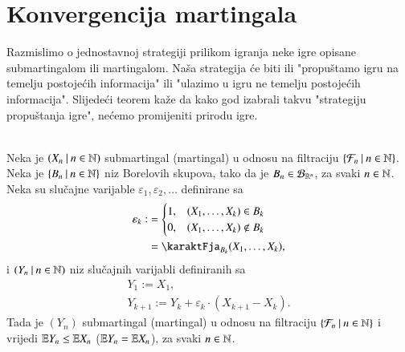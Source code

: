 
\chapter{Konvergencija martingala}

Razmislimo o jednostavnoj strategiji prilikom igranja neke igre opisane submartingalom ili martingalom.
Na\v sa strategija \'ce biti ili "propu\v stamo igru na temelju postoje\' cih informacija" ili "ulazimo u igru ne temelju postoje\' cih informacija".
Slijede\' ci teorem ka\v ze da kako god izabrali takvu "strategiju propu\v stanja igre", ne\' cemo promijeniti prirodu igre.

\begin{tm}  \label{tm:24.1}
    \quad \\
    Neka je $({X_n} \: | \: {n \in \mathbb{N}})$ submartingal (martingal) u odnosu na filtraciju $\{{\mathcal{F}_n} \: | \: {n \in \mathbb{N}}\}$.
    Neka je $\{{B_n} \: | \: {n \in \mathbb{N}}\}$ niz Borelovih skupova, tako da je $B_n \in \mathcal{B}_{\mathbb{R}^n}$, za svaki $n \in \mathbb{N}$.
    Neka su slu\v cajne varijable $\varepsilon_1, \varepsilon_2, \ldots$ definirane sa
    \begin{equation*}
        \begin{aligned}
            \varepsilon_k :&=
        \begin{cases}
            1 ,& (X_1, \ldots, X_k) \in B_k\\
            0 ,& (X_1, \ldots, X_k) \notin B_k
        \end{cases}\\
        &= \karaktFja_{B_k} (X_1, \ldots, X_k),
        \end{aligned}
    \end{equation*}
    i $({Y_n} \: | \: {n \in \mathbb{N}})$ niz slu\v cajnih varijabli definiranih sa
    \begin{equation*}
        \begin{gathered}
            Y_1 := X_1,\\
            Y_{k + 1} := Y_k + \varepsilon_k \cdot (X_{k + 1} - X_k).
        \end{gathered}
    \end{equation*}
    Tada je $(Y_n)$ submartingal (martingal) u odnosu na filtraciju $\{{\mathcal{F}_n} \: | \: {n \in \mathbb{N}}\}$ i vrijedi $\mathbb{E} Y_n \leq \mathbb{E} X_n$ ($\mathbb{E} Y_n = \mathbb{E} X_n$), za svaki $n \in \mathbb{N}$.
\end{tm}

